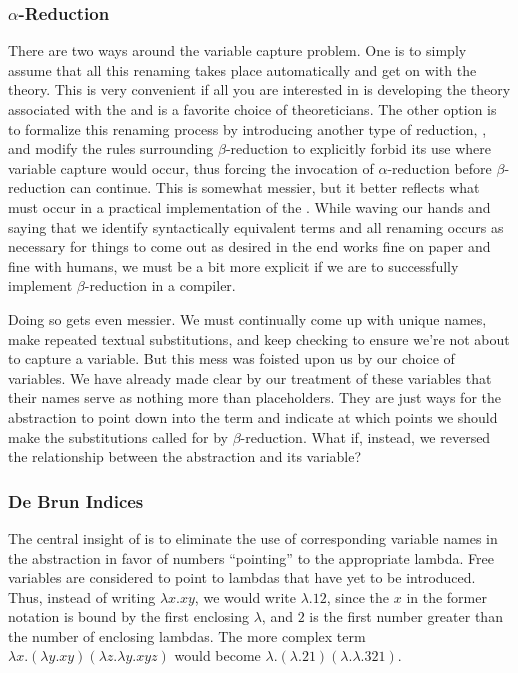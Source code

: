 \subsubsection{\texorpdfstring{$\alpha$-Reduction}{Alpha-Reduction}}\label{untyped:alpha}
There are two ways around the variable capture problem. One is to simply assume that all this renaming takes place automatically and get on with the theory. This is very convenient if all you are interested in is developing the theory associated with the \lambdacalc and is a favorite choice of theoreticians. The other option is to formalize this renaming process by introducing another type of reduction, , and modify the rules surrounding $\beta$-reduction to explicitly forbid its use where variable capture would occur, thus forcing the invocation of $\alpha$-reduction before $\beta$-reduction can continue. This is somewhat messier, but it better reflects what must occur in a practical implementation of the \lambdacalc{}. While waving our hands and saying that we identify syntactically equivalent terms and all renaming occurs as necessary for things to come out as desired in the end works fine on paper and fine with humans, we must be a bit more explicit if we are to successfully implement $\beta$-reduction in a compiler.

Doing so gets even messier. We must continually come up with unique names, make repeated textual substitutions, and keep checking to ensure we're not about to capture a variable. But this mess was foisted upon us by our choice of variables. We have already made clear by our treatment of these variables that their names serve as nothing more than placeholders. They are just ways for the abstraction to point down into the term and indicate at which points we should make the substitutions called for by $\beta$-reduction. What if, instead, we reversed the relationship between the abstraction and its variable?

\subsubsection{De Bru\ij n Indices}\label{untyped:indices}
The central insight of  is to eliminate the use of corresponding variable names in the abstraction in favor of numbers ``pointing'' to the appropriate lambda. Free variables are considered to point to lambdas that have yet to be introduced. Thus, instead of writing $\lambda x . xy$, we would write $\lambda.12$, since the $x$ in the former notation is bound by the first enclosing $\lambda$, and $2$ is the first number greater than the number of enclosing lambdas. The more complex term $\lambda x . (\lambda y . xy) (\lambda z. \lambda y. xyz)$ would become $\lambda . (\lambda . 2 1) (\lambda . \lambda . 321)$.

